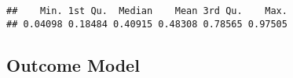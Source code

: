 \documentclass[
]{article}
\newenvironment{Shaded}{\begin{snugshade}}{\end{snugshade}}
\newcommand{\KeywordTok}[1]{\textcolor[rgb]{0.13,0.29,0.53}{\textbf{#1}}}
\newcommand{\NormalTok}[1]{#1}
\newcommand{\OperatorTok}[1]{\textcolor[rgb]{0.81,0.36,0.00}{\textbf{#1}}}
\newcommand{\StringTok}[1]{\textcolor[rgb]{0.31,0.60,0.02}{#1}}
\begin{document}
\begin{Shaded}
\end{Shaded}

\begin{verbatim}
##    Min. 1st Qu.  Median    Mean 3rd Qu.    Max. 
## 0.04098 0.18484 0.40915 0.48308 0.78565 0.97505
\end{verbatim}

\hypertarget{outcome-model-1}{%
\subsection{Outcome Model}\label{outcome-model-1}}
\end{document}

